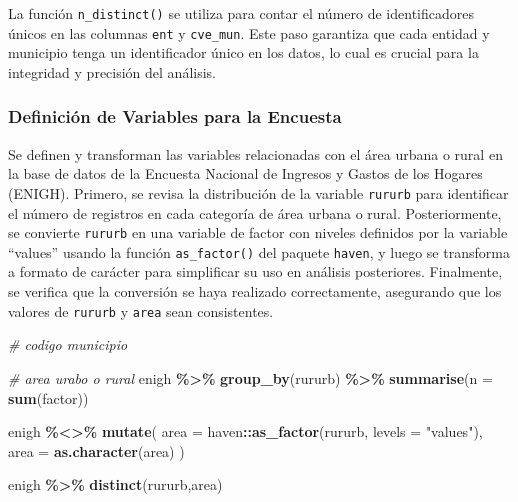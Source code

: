 \documentclass[
  12pt,
]{book}
\newenvironment{Shaded}{\begin{snugshade}}{\end{snugshade}}
\newcommand{\AttributeTok}[1]{\textcolor[rgb]{0.13,0.29,0.53}{#1}}
\newcommand{\CommentTok}[1]{\textcolor[rgb]{0.56,0.35,0.01}{\textit{#1}}}
\newcommand{\FunctionTok}[1]{\textcolor[rgb]{0.13,0.29,0.53}{\textbf{#1}}}
\newcommand{\NormalTok}[1]{#1}
\newcommand{\SpecialCharTok}[1]{\textcolor[rgb]{0.81,0.36,0.00}{\textbf{#1}}}
\newcommand{\StringTok}[1]{\textcolor[rgb]{0.31,0.60,0.02}{#1}}
\begin{document}
\begin{Shaded}
\end{Shaded}

La función \texttt{n\_distinct()} se utiliza para contar el número de identificadores únicos en las columnas \texttt{ent} y \texttt{cve\_mun}. Este paso garantiza que cada entidad y municipio tenga un identificador único en los datos, lo cual es crucial para la integridad y precisión del análisis.

\hypertarget{definiciuxf3n-de-variables-para-la-encuesta}{%
\subsubsection*{Definición de Variables para la Encuesta}\label{definiciuxf3n-de-variables-para-la-encuesta}}

Se definen y transforman las variables relacionadas con el área urbana o rural en la base de datos de la Encuesta Nacional de Ingresos y Gastos de los Hogares (ENIGH). Primero, se revisa la distribución de la variable \texttt{rururb} para identificar el número de registros en cada categoría de área urbana o rural. Posteriormente, se convierte \texttt{rururb} en una variable de factor con niveles definidos por la variable ``values'' usando la función \texttt{as\_factor()} del paquete \texttt{haven}, y luego se transforma a formato de carácter para simplificar su uso en análisis posteriores. Finalmente, se verifica que la conversión se haya realizado correctamente, asegurando que los valores de \texttt{rururb} y \texttt{area} sean consistentes.

\begin{Shaded}
\begin{Highlighting}[]
\CommentTok{\# codigo municipio}

\CommentTok{\# area urabo o rural }
\NormalTok{enigh }\SpecialCharTok{\%\textgreater{}\%} \FunctionTok{group\_by}\NormalTok{(rururb) }\SpecialCharTok{\%\textgreater{}\%} \FunctionTok{summarise}\NormalTok{(}\AttributeTok{n =} \FunctionTok{sum}\NormalTok{(factor))}

\NormalTok{enigh }\SpecialCharTok{\%\textless{}\textgreater{}\%} \FunctionTok{mutate}\NormalTok{(}
  \AttributeTok{area =}\NormalTok{ haven}\SpecialCharTok{::}\FunctionTok{as\_factor}\NormalTok{(rururb, }\AttributeTok{levels  =} \StringTok{"values"}\NormalTok{),}
  \AttributeTok{area =} \FunctionTok{as.character}\NormalTok{(area)}
\NormalTok{)}

\NormalTok{enigh }\SpecialCharTok{\%\textgreater{}\%}   \FunctionTok{distinct}\NormalTok{(rururb,area)}
\end{Highlighting}
\end{Shaded}
\end{document}
